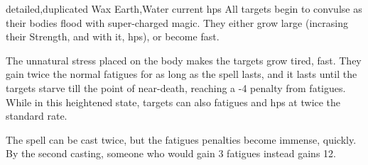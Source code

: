   {detailed,duplicated}%
  {Wax}%
  {Earth,Water}%
  {current \glspl{hp}}%
  {All  targets begin to convulse as their bodies flood with super-charged magic.
    They either grow large (incrasing their Strength, and with it, \glspl{hp}), or become fast.}%
  {The unnatural stress placed on the body makes the targets grow tired, fast.
    They gain twice the normal \glspl{fatigue} for as long as the spell lasts, and it lasts until the targets starve till the point of near-death, reaching a -4 penalty from \glspl{fatigue}.
    While in this heightened state, targets can also \glspl{fatigue} and \glspl{hp} at twice the standard rate.

    The spell can be cast twice, but the \glspl{fatigue} penalties become immense, quickly.
    By the second casting, someone who would gain 3 \glspl{fatigue} instead gains 12.
  }

